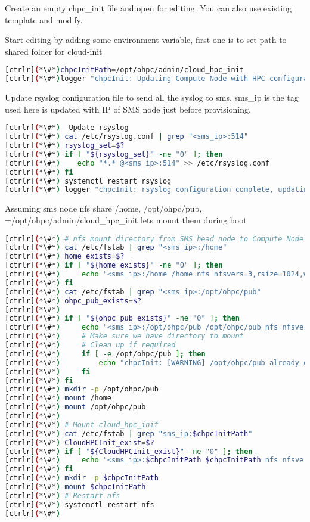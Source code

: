 Create an empty chpc\_init file and open for editing. You can also use  existing template and modify.

Start editing by adding some environment variable, first one is to set path to shared folder for cloud-init

\begin{lstlisting}[language=bash,keywords={}]
[ctrlr](*\#*)chpcInitPath=/opt/ohpc/admin/cloud_hpc_init
[ctrlr](*\#*)logger "chpcInit: Updating Compute Node with HPC configuration"
\end{lstlisting}

Update rsyslog configuration file to send all the syslog to sms. sms\_ip is the tag used here is updated with IP of SMS node just before provisioning.

\begin{lstlisting}[language=bash,keywords={}]
[ctrlr](*\#*)  Update rsyslog
[ctrlr](*\#*) cat /etc/rsyslog.conf | grep "<sms_ip>:514"
[ctrlr](*\#*) rsyslog_set=$?
[ctrlr](*\#*) if [ "${rsyslog_set}" -ne "0" ]; then
[ctrlr](*\#*)    echo "*.* @<sms_ip>:514" >> /etc/rsyslog.conf
[ctrlr](*\#*) fi
[ctrlr](*\#*) systemctl restart rsyslog
[ctrlr](*\#*) logger "chpcInit: rsyslog configuration complete, updating remaining HPC configuration"
\end{lstlisting}

Assuming sms node nfs share /home, /opt/ohpc/pub, =/opt/ohpc/admin/cloud\_hpc\_init lets mount them during boot

\begin{lstlisting}[language=bash,keywords={}]
[ctrlr](*\#*) # nfs mount directory from SMS head node to Compute Node
[ctrlr](*\#*) cat /etc/fstab | grep "<sms_ip>:/home"
[ctrlr](*\#*) home_exists=$?
[ctrlr](*\#*) if [ "${home_exists}" -ne "0" ]; then
[ctrlr](*\#*)     echo "<sms_ip>:/home /home nfs nfsvers=3,rsize=1024,wsize=1024,cto 0 [ctrlr](*\#*) 0" >> /etc/fstab
[ctrlr](*\#*) fi
[ctrlr](*\#*) cat /etc/fstab | grep "<sms_ip>:/opt/ohpc/pub"
[ctrlr](*\#*) ohpc_pub_exists=$?
[ctrlr](*\#*) 
[ctrlr](*\#*) if [ "${ohpc_pub_exists}" -ne "0" ]; then
[ctrlr](*\#*)     echo "<sms_ip>:/opt/ohpc/pub /opt/ohpc/pub nfs nfsvers=3 0 0" >> /etc/fstab
[ctrlr](*\#*)     # Make sure we have directory to mount
[ctrlr](*\#*)     # Clean up if required
[ctrlr](*\#*)     if [ -e /opt/ohpc/pub ]; then
[ctrlr](*\#*)         echo "chpcInit: [WARNING] /opt/ohpc/pub already exists!!"
[ctrlr](*\#*)     fi
[ctrlr](*\#*) fi
[ctrlr](*\#*) mkdir -p /opt/ohpc/pub
[ctrlr](*\#*) mount /home
[ctrlr](*\#*) mount /opt/ohpc/pub
[ctrlr](*\#*) 
[ctrlr](*\#*) # Mount cloud_hpc_init
[ctrlr](*\#*) cat /etc/fstab | grep "sms_ip:$chpcInitPath"
[ctrlr](*\#*) CloudHPCInit_exist=$?
[ctrlr](*\#*) if [ "${CloudHPCInit_exist}" -ne "0" ]; then
[ctrlr](*\#*)     echo "<sms_ip>:$chpcInitPath $chpcInitPath nfs nfsvers=3 0 0" >> /etc/fstab
[ctrlr](*\#*) fi
[ctrlr](*\#*) mkdir -p $chpcInitPath
[ctrlr](*\#*) mount $chpcInitPath
[ctrlr](*\#*) # Restart nfs
[ctrlr](*\#*) systemctl restart nfs
[ctrlr](*\#*) 
\end{lstlisting}

